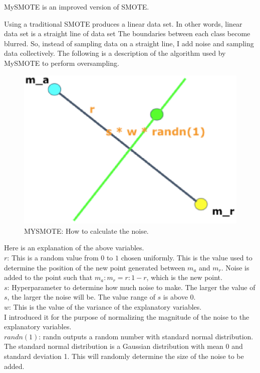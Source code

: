 MySMOTE is an improved version of SMOTE.

Using a traditional SMOTE produces a linear data set.
In other words, linear data set is a straight line of data set
The boundaries between each class become blurred.
So, instead of sampling data on a straight line, I add noise and sampling data collectively.
The following is a description of the algorithm used by MySMOTE to perform oversampling.

\begin{center}
    \begin{figure}[ht]
        \caption{MYSMOTE: How to calculate the noise.}
        \label{tab:team-rating-features}
        \begin{center}
            \includegraphics[scale=0.6]{image/mysmote1.eps}
        \end{center}
    \end{figure}
\end{center}

Here is an explanation of the above variables.\\
$r$: This is a random value from $0$ to $1$ chosen uniformly.
This is the value used to determine the position of the new point generated between $m_a$ and $m_r$.
Noise is added to the point such that $m_a:m_r=r:1-r$, which is the new point.\\
$s$: Hyperparameter to determine how much noise to make.
The larger the value of $s$, the larger the noise will be.
The value range of $s$ is above 0.\\
$w$: This is the value of the variance of the explanatory variables.\\
I introduced it for the purpose of normalizing the magnitude of the noise to the explanatory variables.\\
$randn(1)$: randn outputs a random number with standard normal distribution.
The standard normal distribution is a Gaussian distribution with mean 0 and standard deviation 1.
This will randomly determine the size of the noise to be added.\\


